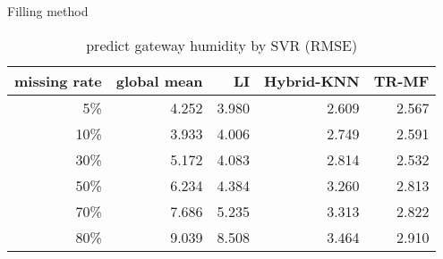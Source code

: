 \begin{table}[htbp]
\setlength{\tabcolsep}{2pt}
\centering
\caption{predict gateway humidity by SVR (RMSE) }
\label{table: SVR}
   Filling method
\begin{tabular}{ r | r r r r}
        missing rate&global mean     &LI   &Hybrid-KNN &TR-MF\\ \hline
        5\%&4.252&3.980&2.609&2.567\\
        10\%    &3.933 &4.006&2.749&2.591\\
        30\%    &5.172&4.083&2.814&2.532\\
        50\%    &6.234&4.384&3.260&2.813\\
        70\%   &7.686&5.235&3.313&2.822\\
        80\%  &9.039&8.508&3.464&2.910\\
\end{tabular}
\end{table}
